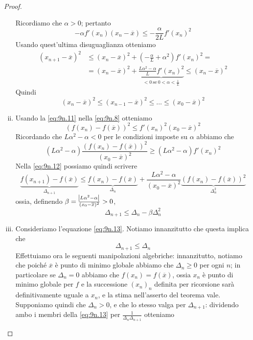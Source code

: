 \begin{proof}
\begin{enumerate}[(i)]
\[        \]
        Ricordiamo che $\alpha>0$; pertanto
        \[
        -\alpha f'(x_n)(x_n-\overline{x})\le -\frac{\alpha}{2L}f'(x_n)^2
        \]
        Usando quest'ultima disuguaglianza otteniamo
        \[
        \begin{split}
            (x_{n+1}-\overline{x})^2 &\le (x_n-\overline{x})^2+\left(-\frac{\alpha}{L}+\alpha^2\right)f'(x_n)^2 = \\
            & = (x_n-\overline{x})^2+ \underbrace{\frac{L\alpha^2-\alpha}{L}f'(x_n)^2}_{<0 \ \text{se} \ 0<\alpha<\frac{1}{L}} \le (x_n-\overline{x})^2
        \end{split}
        \]
        Quindi
        \begin{equation}
            \label{eq:9n.11}
            (x_n-\overline{x})^2 \le (x_{n-1}-\overline{x})^2 \le \dots \le (x_0-\overline{x})^2
        \end{equation}
        \item Usando la \eqref{eq:9n.11} nella \eqref{eq:9n.8} otteniamo
        \[
        (f(x_n)-f(\overline{x}))^2 \le f'(x_n)^2(x_0-\overline{x})^2
        \]
        Ricordando che $L\alpha^2-\alpha<0$ per le condizioni imposte su $\alpha$ abbiamo che
        \[
        (L\alpha^2-\alpha)\frac{(f(x_n)-f(\overline{x}))^2}{(x_0-\overline{x})^2}\ge (L\alpha^2-\alpha) f'(x_n)^2
        \]
        Nella \eqref{eq:9n.12} possiamo quindi scrivere
        \[
            \underbrace{f(x_{n+1})-f(\overline{x})}_{\Delta_{n+1}}\le \underbrace{f(x_n)-f(\overline{x})}_{\Delta_n} + \frac{L\alpha^2-\alpha}{(x_0-\overline{x})^2}\underbrace{(f(x_n)-f(\overline{x}))^2}_{\Delta_n^2}
        \]
        ossia, definendo $\beta = \frac{\abs{L\alpha^2-\alpha}}{(x_0-\overline{x})^2}>0$,
        \begin{equation}
            \label{eq:9n.13}
            \Delta_{n+1} \le \Delta_n -\beta \Delta_n^2
        \end{equation}
        \item Consideriamo l'equazione \eqref{eq:9n.13}. Notiamo innanzitutto che questa implica che
        \[
        \Delta_{n+1}\le \Delta_n
        \]
        Effettuiamo ora le seguenti manipolazioni algebriche: innanzitutto, notiamo che poiché $\overline{x}$ è punto di minimo globale abbiamo che $\Delta_n\ge 0$ per ogni $n$; in particolare se $\Delta_n=0$ abbiamo che $f(x_n) = f(\overline{x})$, ossia $x_n$ è punto di minimo globale per $f$ e la successione $(x_n)_n$ definita per ricorsione sarà definitivamente uguale a $x_n$, e la stima nell'asserto del teorema vale. Supponiamo quindi che $\Delta_n>0$, e che lo stesso valga per $\Delta_{n+1}$: dividendo ambo i membri della \eqref{eq:9n.13} per $\frac{1}{\Delta_n \Delta_{n+1}}$ otteniamo

\end{enumerate}
\end{proof}

